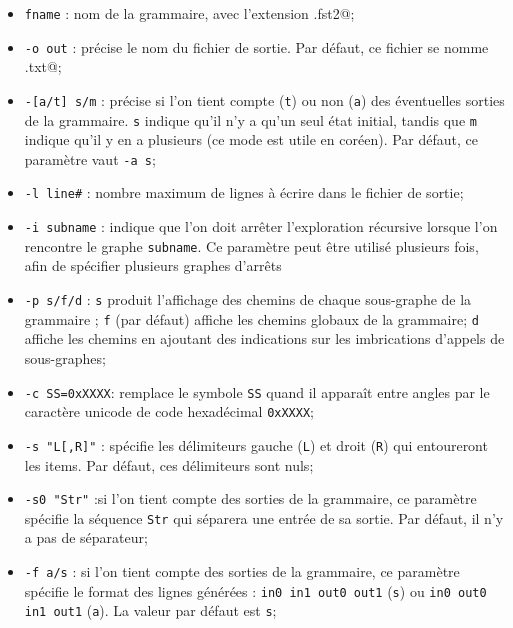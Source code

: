 \begin{itemize}
  \item \verb$fname$ : nom de la grammaire, avec l’extension \verb@.fst2@;
  \item \verb$-o out$ : précise le nom du fichier de sortie. Par défaut, ce fichier se nomme
  	  \verb@lst.txt@;
  \item \verb$-[a/t] s/m$ : précise si l’on tient compte (\verb$t$) ou non (\verb$a$) des
  	 éventuelles sorties de la grammaire. \verb$s$ indique qu’il n’y a qu’un seul état initial,
  	 tandis que \verb$m$ indique qu’il y en a plusieurs (ce mode est utile en coréen). 
  	 Par défaut, ce paramètre vaut \verb$-a s$;

  \item \verb$-l line#$ : nombre maximum de lignes à écrire dans le fichier de sortie;
  \item \verb$-i subname$ : indique que l’on doit arrêter l’exploration récursive lorsque l’on
   rencontre le graphe \verb$subname$. Ce paramètre peut être utilisé plusieurs fois, afin
   de spécifier plusieurs graphes d’arrêts

  \item \verb$-p s/f/d$ : \verb$s$ produit l’affichage des chemins de chaque sous-graphe de la
  	  grammaire ; \verb$f$ (par défaut) affiche les chemins globaux de la grammaire; \verb$d$ affiche les chemins en ajoutant des indications sur les imbrications d’appels de sous-graphes;

  \item \verb$-c SS=0xXXXX$: remplace le symbole \verb$SS$ quand il apparaît entre angles par
  le caractère unicode de code hexadécimal \verb$0xXXXX$;

  \item \verb$-s "L[,R]"$ : spécifie les délimiteurs gauche (\verb$L$) et droit (\verb$R$)
  qui entoureront les items. Par défaut, ces délimiteurs sont nuls;

  \item \verb$-s0 "Str"$ :si l’on tient compte des sorties de la grammaire, ce paramètre spécifie la
   séquence \verb$Str$ qui séparera une entrée de sa sortie. Par défaut, il n’y a pas de séparateur;

  \item \verb$-f a/s$ : si l’on tient compte des sorties de la grammaire, ce paramètre spécifie le
  format des lignes générées :
  \verb$in0 in1 out0 out1$ (\verb$s$) ou \verb$in0 out0 in1 out1$ (\verb$a$). La valeur par défaut
  est \verb$s$;
  

\end{itemize}

